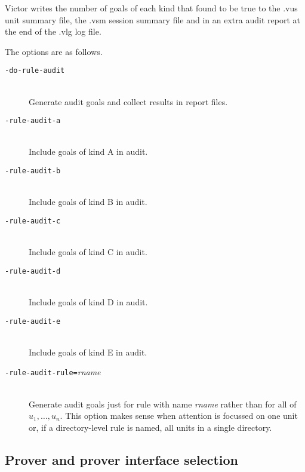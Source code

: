 \documentclass[12pt,fleqn]{article}
\newcommand{\optionb}[1]{\item[\texttt{-{#1}}]\ \\}
\newcommand{\optionv}[2]{\item[\texttt{-{#1}=}\mdseries\textit{#2}]\ \\}
\begin{document}
Victor writes the number of goals of each kind that found to be true
to the .vus unit summary file, the .vsm session summary file and in an
extra audit report at the end of the .vlg log file.

The options are as follows.
\begin{description}
\optionb{do-rule-audit} Generate audit goals and collect results 
  in report files.
\optionb{rule-audit-a}  Include goals of kind A in audit.
\optionb{rule-audit-b}  Include goals of kind B in audit.
\optionb{rule-audit-c}  Include goals of kind C in audit.
\optionb{rule-audit-d}  Include goals of kind D in audit.
\optionb{rule-audit-e}  Include goals of kind E in audit.
\optionv{rule-audit-rule}{rname} 
  Generate audit goals just for rule with name \emph{rname} rather than
  for all of $u_1, \ldots, u_n$.  This option makes sense when attention
  is focussed on one unit or, if a directory-level rule is named, all
  units in a single directory.
\end{description}

\subsection{Prover and prover interface selection}
\end{document}
